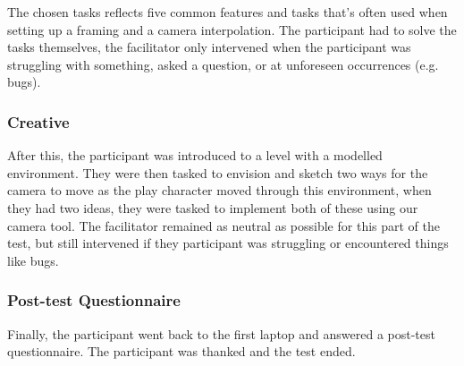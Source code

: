 The chosen tasks reflects five common features and tasks that's often used when setting up a framing and a camera interpolation. The participant had to solve the tasks themselves, the facilitator only intervened when the participant was struggling with something, asked a question, or at unforeseen occurrences (e.g. bugs). 

\subsubsection{Creative} %
After this, the participant was introduced to a level with a modelled environment. They were then tasked to envision and sketch two ways for the camera to move as the play character moved through this environment, when they had two ideas, they were tasked to implement both of these using our camera tool. The facilitator remained as neutral as possible for this part of the test, but still intervened if they participant was struggling or encountered things like bugs.

\subsubsection{Post-test Questionnaire} %
Finally, the participant went back to the first laptop and answered a post-test questionnaire. The participant was thanked and the test ended.